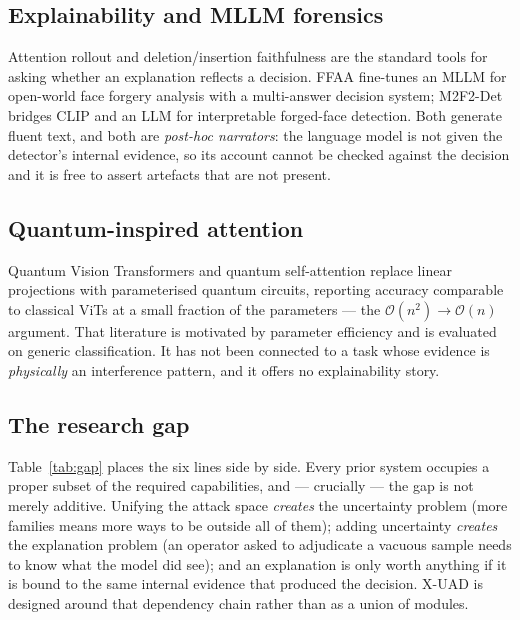 \documentclass[conference]{IEEEtran}
\begin{document}
\subsection{Explainability and MLLM forensics}
Attention rollout \cite{abnar2020rollout} and deletion/insertion faithfulness
\cite{petsiuk2018rise} are the standard tools for asking whether an explanation
reflects a decision. FFAA \cite{huang2024ffaa} fine-tunes an MLLM for open-world
face forgery analysis with a multi-answer decision system; M2F2-Det
\cite{guo2025m2f2det} bridges CLIP and an LLM for interpretable forged-face
detection. Both generate fluent text, and both are \emph{post-hoc narrators}: the
language model is not given the detector's internal evidence, so its account cannot
be checked against the decision and it is free to assert artefacts that are not
present.

\subsection{Quantum-inspired attention}
Quantum Vision Transformers \cite{cherrat2024qvt} and quantum self-attention
\cite{comajoan2024qgluon,evans2025on} replace linear projections with parameterised
quantum circuits, reporting accuracy comparable to classical ViTs at a small
fraction of the parameters --- the $\mathcal{O}(n^{2})\!\to\!\mathcal{O}(n)$
argument. That literature is motivated by parameter efficiency and is evaluated on
generic classification. It has not been connected to a task whose evidence is
\emph{physically} an interference pattern, and it offers no explainability story.

\subsection{The research gap}
Table~\ref{tab:gap} places the six lines side by side. Every prior system occupies
a proper subset of the required capabilities, and --- crucially --- the gap is not
merely additive. Unifying the attack space \emph{creates} the uncertainty problem
(more families means more ways to be outside all of them); adding uncertainty
\emph{creates} the explanation problem (an operator asked to adjudicate a vacuous
sample needs to know what the model did see); and an explanation is only worth
anything if it is bound to the same internal evidence that produced the decision.
X-UAD is designed around that dependency chain rather than as a union of modules.
\end{document}
